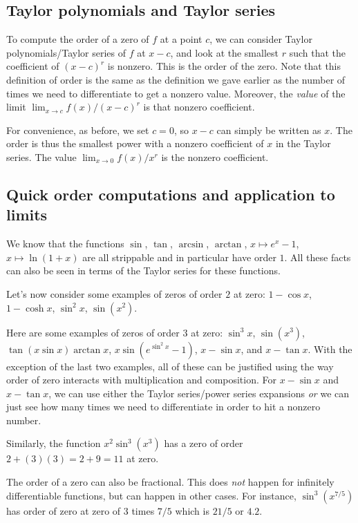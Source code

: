 \documentclass[10pt]{amsart}
\begin{document}
\subsection{Taylor polynomials and Taylor series}

To compute the order of a zero of $f$ at a point $c$, we can consider
Taylor polynomials/Taylor series of $f$ at $x - c$, and look at the
smallest $r$ such that the coefficient of $(x - c)^r$ is nonzero. This
is the order of the zero. Note that this definition of order is the
same as the definition we gave earlier as the number of times we need
to differentiate to get a nonzero value. Moreover, the {\em value} of
the limit $\lim_{x \to c} f(x)/(x - c)^r$ is that nonzero coefficient.

For convenience, as before, we set $c = 0$, so $x - c$ can simply be
written as $x$. The order is thus the smallest power with a nonzero
coefficient of $x$ in the Taylor series. The value $\lim_{x \to 0}
f(x)/x^r$ is the nonzero coefficient.

\subsection{Quick order computations and application to limits}

We know that the functions $\sin$, $\tan$, $\arcsin$, $\arctan$, $x
\mapsto e^x - 1$, $x \mapsto \ln(1 + x)$ are all strippable and in
particular have order $1$. All these facts can also be seen in terms
of the Taylor series for these functions.

Let's now consider some examples of zeros of order $2$ at zero: $1 - \cos x$,
$1 - \cosh x$, $\sin^2 x$, $\sin(x^2)$.

Here are some examples of zeros of order $3$ at zero: $\sin^3x$,
$\sin(x^3)$, $\tan(x \sin x)\arctan x$, $x\sin(e^{\sin^2x} - 1)$, $x -
\sin x$, and $x - \tan x$. With the exception of the last two
examples, all of these can be justified using the way order of zero
interacts with multiplication and composition. For $x - \sin x$ and $x
- \tan x$, we can use either the Taylor series/power series expansions
{\em or} we can just see how many times we need to differentiate in
order to hit a nonzero number.

Similarly, the function $x^2 \sin^3(x^3)$ has a zero of order $2 +
(3)(3) = 2 + 9 = 11$ at zero.

The order of a zero can also be fractional. This does {\em not} happen
for infinitely differentiable functions, but can happen in other
cases. For instance, $\sin^3(x^{7/5})$ has order of zero at zero of
$3$ times $7/5$ which is $21/5$ or $4.2$.
\end{document}
